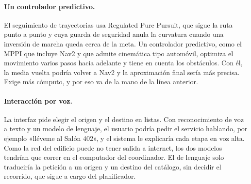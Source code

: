 \paragraph{Un controlador predictivo.} El seguimiento de trayectorias usa
Regulated Pure Pursuit, que sigue la ruta punto a punto y cuya guarda de
seguridad anula la curvatura cuando una inversión de marcha queda cerca de la
meta. Un controlador predictivo, como el MPPI que incluye Nav2 y que admite
cinemática tipo automóvil, optimiza el movimiento varios pasos hacia adelante y
tiene en cuenta los obstáculos. Con él, la media vuelta podría volver a Nav2 y
la aproximación final sería más precisa. Exige más cómputo, y por eso va de la
mano de la línea anterior.

\paragraph{Interacción por voz.} La interfaz pide elegir el origen y el destino
en listas. Con reconocimiento de voz a texto y un modelo de lenguaje, el usuario
podría pedir el servicio hablando, por ejemplo «lléveme al Salón 402», y el
sistema le explicaría cada etapa en voz alta. Como la red del edificio puede no
tener salida a internet, los dos modelos tendrían que correr en el computador del coordinador. El de lenguaje solo traduciría la petición a un origen y un
destino del catálogo, sin decidir el recorrido, que sigue a cargo del
planificador.

